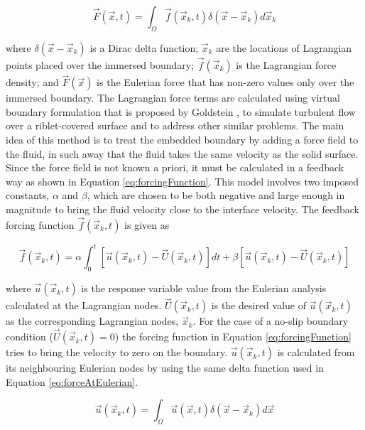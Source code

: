 \documentclass[12pt]{aiaa-pretty}
\begin{document}
%
\begin{equation}\label{eq:forceAtEulerian}
	\vec{F}(\vec{x}, t) = \int_\Omega \vec{f} (\vec{x}_k, t) \delta(\vec{x} - \vec{x}_k) d\vec{x}_k
\end{equation}
%

where $\delta(\vec{x} - \vec{x}_k)$ is a Dirac delta function; $\vec{x}_k$ are the locations of Lagrangian points placed over the immersed boundary; $\vec{f}(\vec{x}_k)$ is the Lagrangian force density; and $\vec{F}(\vec{x})$ is the Eulerian force that has non-zero values only over the immersed boundary. The Lagrangian force terms are calculated using virtual boundary formulation that is proposed by Goldstein \cite{goldstein1993modeling}, to simulate turbulent flow over a riblet-covered surface and to address other similar problems. The main idea of this method is to treat the embedded boundary by adding a force field to the fluid, in such away that the fluid takes the same velocity as the solid surface. Since the force field is not known a priori, it must be calculated in a feedback way as shown in Equation \eqref{eq:forcingFunction}. This model involves two imposed constants, $\alpha$ and $\beta$, which are chosen to be both negative and large enough in magnitude to bring the fluid velocity close to the interface velocity. The feedback forcing function $\vec{f}(\vec{x}_k, t)$ is given as

%
\begin{equation}\label{eq:forcingFunction}
	\vec{f}\left( \vec{x}_k, t \right) = 
	\alpha \int_0^t \left[ \vec{u}\left( \vec{x}_k, t \right) - \vec{U}\left( \vec{x}_k, t \right) \right]dt + 
	\beta \left[ \vec{u}\left( \vec{x}_k, t \right) - \vec{U}\left( \vec{x}_k, t \right) \right]
\end{equation}
%

where $\vec{u}\left( \vec{x}_k, t \right)$ is the response variable value from the Eulerian analysis calculated at the Lagrangian nodes. $\vec{U}\left( \vec{x}_k, t \right)$ is the desired value of $\vec{u}\left( \vec{x}_k, t \right)$ as the corresponding Lagrangian nodes, $\vec{x}_k$. For the case of a no-slip boundary condition ($\vec{U}\left( \vec{x}_k, t \right) = 0 $) the forcing function in Equation \eqref{eq:forcingFunction} tries to bring the velocity to zero on the boundary. $\vec{u}\left( \vec{x}_k, t \right)$ is calculated from its neighbouring Eulerian nodes by using the same delta function used in Equation \eqref{eq:forceAtEulerian}.

%
\begin{equation}\label{eq:velocityAtLagrangian}
	\vec{u}(\vec{x}_k, t) = \int_\Omega \vec{u} (\vec{x}, t) \delta(\vec{x} - \vec{x}_k) d\vec{x}
\end{equation}
%
\end{document}

